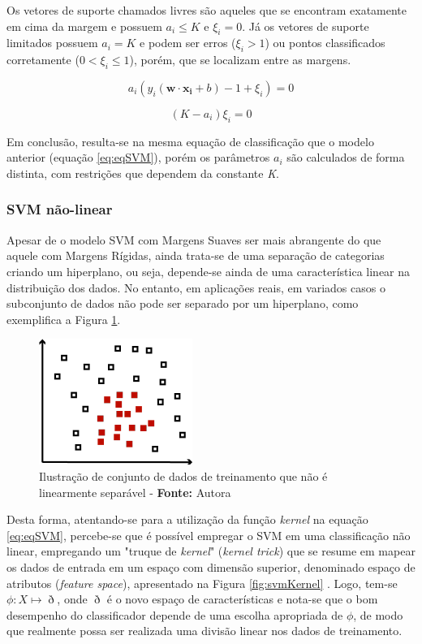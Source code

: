 Os vetores de suporte chamados livres são aqueles que se encontram exatamente em cima da margem e possuem $a_i \leq K$ e $\xi_i = 0$. Já os vetores de suporte limitados possuem $a_i = K$ e podem ser erros ($\xi_i > 1$) ou pontos classificados corretamente ($0 <\xi_i \leq 1$), porém, que se localizam entre as margens.

\begin{equation}
\label{eq:eqCondicaoMarg1}
 a_i(y_i(\boldsymbol{w} \cdot \boldsymbol{x_i} + b) - 1 + \xi_i) = 0
\end{equation}

\begin{equation}
\label{eq:eqCondicaoMarg2}
 (K - a_i)\xi_i = 0
\end{equation}

Em conclusão, resulta-se na mesma equação de classificação que o modelo anterior (equação \ref{eq:eqSVM}), porém os parâmetros $a_i$ são calculados de forma distinta, com restrições que dependem da constante \textit{K}.

\subsubsection{SVM não-linear}

Apesar de o modelo SVM com Margens Suaves ser mais abrangente do que aquele com Margens Rígidas, ainda trata-se de uma separação de categorias criando um hiperplano, ou seja, depende-se ainda de uma característica linear na distribuição dos dados. No entanto, em aplicações reais, em variados casos o subconjunto de dados não pode ser separado por um hiperplano, como exemplifica a Figura \ref{fig:svmNL}.

\begin{figure}[H]
 \centering
  \includegraphics[width=0.35\linewidth]{figuras/svmNL.pdf}
  \caption{Ilustração de conjunto de dados de treinamento que não é linearmente separável - \textbf{Fonte:} Autora}
  \label{fig:svmNL}
\end{figure}

Desta forma, atentando-se para a utilização da função \textit{kernel} na equação \ref{eq:eqSVM}, percebe-se que é possível empregar o SVM em uma classificação não linear, empregando um "truque de \textit{kernel}" { }(\textit{kernel trick}) que se resume em mapear os dados de entrada em um espaço com dimensão superior, denominado espaço de atributos (\textit{feature space}), apresentado na Figura \ref{fig:svmKernel}  . Logo, tem-se $\phi:X\mapsto\eth$, onde $\eth$ é o novo espaço de características e nota-se que o bom desempenho do classificador depende de uma escolha apropriada de $\phi$, de modo que realmente possa ser realizada uma divisão linear nos dados de treinamento.

